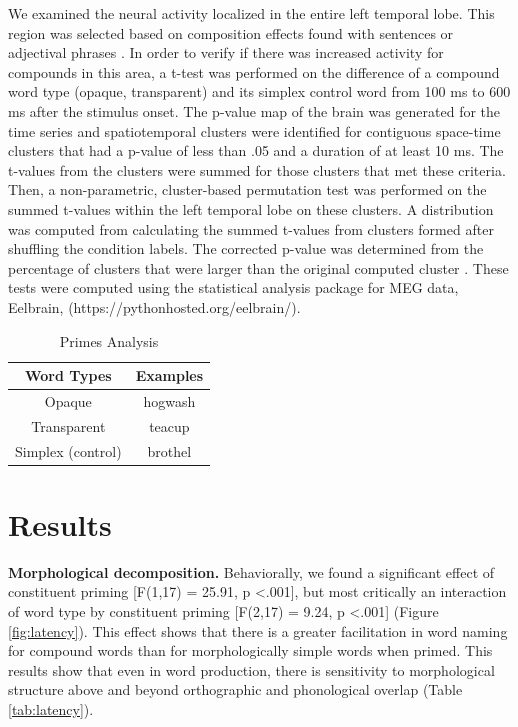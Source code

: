 \documentclass{frontiersSCNS}
\begin{document}
We examined the neural activity localized in the entire left temporal lobe. This region was selected based on composition effects found with sentences \citep{Friederici:2000} or adjectival phrases \citep{Bemis:2011}.
In order to verify if there was increased activity for compounds in this area, a t-test was performed on the difference of a compound word type (opaque, transparent) and its simplex control word from 100 ms to 600 ms after the stimulus onset. The p-value map of the brain was generated for the time series and spatiotemporal clusters were identified for contiguous space-time clusters that had a p-value of less than .05 and a duration of at least 10 ms. The t-values from the clusters were summed for those clusters that met these criteria. Then, a non-parametric, cluster-based permutation test was performed on the summed t-values within the left temporal lobe on these clusters. A distribution was computed from calculating the summed t-values from clusters formed after shuffling the condition labels. The corrected p-value was determined from the percentage of clusters that were larger than the original computed cluster \citep{Maris:2007}. These tests were computed using the statistical analysis package for MEG data, Eelbrain, (https://pythonhosted.org/eelbrain/).

\begin{table}
\centering{}%
\begin{tabular}{|c|c|}
\hline
Word Types & Examples\tabularnewline
\hline
\hline
Opaque & hogwash\tabularnewline
\hline
Transparent & teacup\tabularnewline
\hline
Simplex (control) & brothel\tabularnewline
\hline
\end{tabular}\caption{\label{tab:Primes-Analysis} Primes Analysis}
\end{table}

\section{Results}
 
\textbf{Morphological decomposition.} Behaviorally, we found a significant effect of  constituent priming [F(1,17) = 25.91, p \textless .001], but most critically an interaction of word type by constituent priming [F(2,17) = 9.24, p \textless .001] (Figure \ref{fig:latency}). This effect shows that there is a greater facilitation in word naming for compound words than for morphologically simple words when primed. This results show that even in word production, there is sensitivity to morphological structure above and beyond orthographic and phonological overlap (Table \ref{tab:latency}). 
\end{document}
